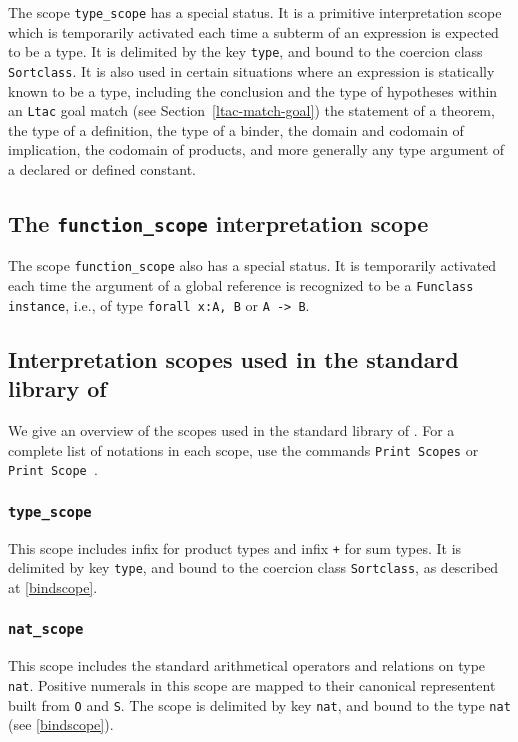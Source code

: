 The scope {\tt type\_scope} has a special status. It is a primitive
interpretation scope which is temporarily activated each time a
subterm of an expression is expected to be a type.  It is delimited by
the key {\tt type}, and bound to the coercion class {\tt Sortclass}. It is also
used in certain situations where an expression is statically known to
be a type, including the conclusion and the type of hypotheses within
an {\tt Ltac} goal match (see Section~\ref{ltac-match-goal})
the statement of a theorem, the type of
a definition, the type of a binder, the domain and codomain of
implication, the codomain of products, and more generally any type
argument of a declared or defined constant.

\subsection[The {\tt function\_scope} interpretation scope]{The {\tt function\_scope} interpretation scope}

The scope {\tt function\_scope} also has a special status. 
It is temporarily activated each time the argument of a global reference is
recognized to be a {\tt Funclass instance}, i.e., of type {\tt forall x:A, B} or {\tt A -> B}.

\subsection{Interpretation scopes used in the standard library of {\Coq}}

We give an overview of the scopes used in the standard library of
{\Coq}. For a complete list of notations in each scope, use the
commands {\tt Print Scopes} or {\tt Print Scope {\scope}}.

\subsubsection{\tt type\_scope}

This scope includes infix {\tt *} for product types and infix {\tt +} for
sum types. It is delimited by key {\tt type}, and bound to the coercion class 
{\tt Sortclass}, as described at \ref{bindscope}.

\subsubsection{\tt nat\_scope}

This scope includes the standard arithmetical operators and relations on
type {\tt nat}. Positive numerals in this scope are mapped to their
canonical representent built from {\tt O} and {\tt S}. The scope is
delimited by key {\tt nat}, and bound to the type {\tt nat} (see \ref{bindscope}).


